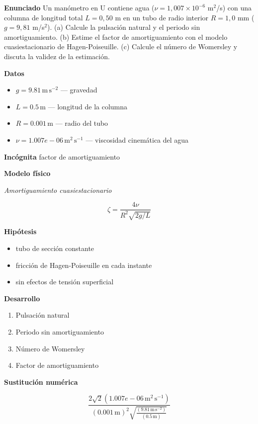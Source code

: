 \documentclass[10pt,openany]{book}
\begin{document}
\begin{tcolorbox}[title={Problema resuelto}, studiumworked, breakable]

\noindent\textbf{Enunciado}
Un manómetro en U contiene agua (\(\nu = 1{,}007\times 10^{-6}\) m\(^2\)/s) con una columna de longitud total \(L = 0{,}50\) m en un tubo de radio interior \(R = 1{,}0\) mm (\(g = 9{,}81\) m/s\(^2\)). (a) Calcule la pulsación natural y el periodo sin amortiguamiento. (b) Estime el factor de amortiguamiento con el modelo cuasiestacionario de Hagen-Poiseuille. (c) Calcule el número de Womersley y discuta la validez de la estimación.

\noindent\textbf{Datos}
\begin{itemize}
\item $g = 9.81\,\mathrm{m}\,\mathrm{s}^{-2}$ — gravedad
\item $L = 0.5\,\mathrm{m}$ — longitud de la columna
\item $R = 0.001\,\mathrm{m}$ — radio del tubo
\item $\nu = 1.007e-06\,\mathrm{m}^{2}\,\mathrm{s}^{-1}$ — viscosidad cinemática del agua
\end{itemize}

\noindent\textbf{Incógnita}
factor de amortiguamiento

\noindent\textbf{Modelo físico}

\noindent\textit{Amortiguamiento cuasiestacionario}

\[
\zeta = \frac{4\nu}{R^{2}\sqrt{2g/L}}
\]

\noindent\textbf{Hipótesis}
\begin{itemize}
\item tubo de sección constante
\item fricción de Hagen-Poiseuille en cada instante
\item sin efectos de tensión superficial
\end{itemize}

\noindent\textbf{Desarrollo}
\begin{enumerate}
\item
Pulsación natural
\item
Periodo sin amortiguamiento
\item
Número de Womersley
\item
Factor de amortiguamiento
\end{enumerate}

\noindent\textbf{Sustitución numérica}

\[
\frac{2 \sqrt{2} \left(1.007e-06\,\mathrm{m}^{2}\,\mathrm{s}^{-1}\right)}{\left(0.001\,\mathrm{m}\right)^{2} \sqrt{\frac{\left(9.81\,\mathrm{m}\,\mathrm{s}^{-2}\right)}{\left(0.5\,\mathrm{m}\right)}}}
\]


\end{tcolorbox}
\end{document}
